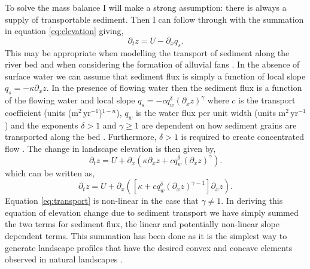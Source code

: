 To solve the mass balance I will make a strong assumption: there is always a supply of transportable sediment. Then I can follow through with the summation in equation \ref{eq:elevation} giving,
\begin{equation}
\partial_{t}z = U - \partial_{x}q_{s}.
\end{equation}
This may be appropriate when modelling the transport of sediment along the river bed and when considering the formation of alluvial fans \citep[e.g.][]{paola-etal-1992,whipple-2002,guerit-etal-2014}. In the absence of surface water we can assume that sediment flux is simply a function of local slope $q_{s} = -\kappa\partial_{x}z$. In the presence of flowing water then the sediment flux is a function of the flowing water and local slope $q_{s} = -cq_{w}^{\delta}\left(\partial_{x}z\right)^{\gamma}$ where $c$ is the transport coefficient (units (m$^{2}$\,yr$^{-1}$)$^{1-n}$), $q_{w}$ is the water flux per unit width (units m$^{2}$\,yr$^{-1}$) and the exponents $\delta > 1$ and $\gamma \geq 1$ are dependent on how sediment grains are transported along the bed \citep{smith-1972,paola-etal-1992}. Furthermore, $\delta > 1$ is required to create concentrated flow \citep{smith-1972}. The change in landscape elevation is then given by,
\begin{equation}
\partial_{t}z = U + \partial_{x}\left(\kappa\partial_{x}z +cq_{w}^{\delta}\left(\partial_{x}z\right)^{\gamma}\right).
\end{equation}
which can be written as,
\begin{equation}
\partial_{t}z = U + \partial_{x}\left(\left[\kappa +cq_{w}^{\delta}\left(\partial_{x}z\right)^{\gamma-1}\right]\partial_{x}z\right).
\label{eq:transport}
\end{equation}
Equation \ref{eq:transport} is non-linear in the case that $\gamma \neq 1$. In deriving this equation of elevation change due to sediment transport we have simply summed the two terms for sediment flux, the linear and potentially non-linear slope dependent terms. This summation has been done as it is the simplest way to generate landscape profiles that have the desired convex and concave elements observed in natural landscapes \citep{smith-1972}.


